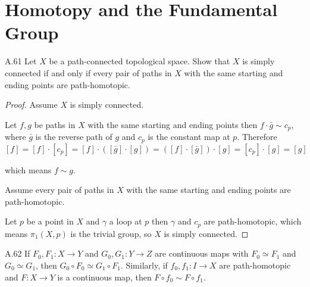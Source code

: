 \section{Homotopy and the Fundamental Group}

\begin{exercise}{A.61}
    Let \( X \) be a path-connected topological space. Show that \( X \) is simply connected if and only if every pair of paths in \( X \) with the same starting and ending points are path-homotopic.
\end{exercise}

\begin{proof}
    Assume \( X \) is simply connected.

    Let \( f, g \) be paths in \( X \) with the same starting and ending points then \( f \cdot \bar{g} \sim c_{p} \), where \( \bar{g} \) is the reverse path of \( g \) and \( c_{p} \) is the constant map at \( p \). Therefore
    \[
        [f] = [f] \cdot [c_{p}] = [f] \cdot ([\bar{g}] \cdot [g]) = ([f] \cdot [\bar{g}]) \cdot [g] = [c_{p}] \cdot [g] = [g]
    \]

    which means \( f \sim g \).

    Assume every pair of paths in \( X \) with the same starting and ending points are path-homotopic.

    Let \( p \) be a point in \( X \) and \( \gamma \) a loop at \( p \) then \( \gamma \) and \( c_{p} \) are path-homotopic, which means \( \pi_{1}(X, p) \) is the trivial group, so \( X \) is simply connected.
\end{proof}

\begin{exercise}{A.62}
    If \( F_{0}, F_{1}: X \to Y \) and \( G_{0}, G_{1}: Y \to Z \) are continuous maps with \( F_{0} \simeq F_{1} \) and \( G_{0} \simeq G_{1} \), then \( G_{0} \circ F_{0} \simeq G_{1} \circ F_{1} \). Similarly, if \( f_{0}, f_{1}: I \to X  \) are path-homotopic and \( F: X \to Y \) is a continuous map, then \( F \circ f_{0} \sim F \circ f_{1} \).
\end{exercise}

